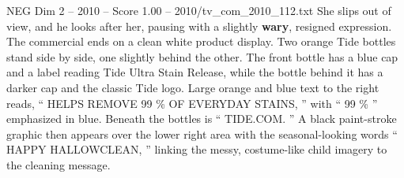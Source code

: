 \begin{textsample}{NEG Dim 2 – 2010 – Score 1.00 – 2010/tv\_com\_2010\_112.txt}
She slips out of view, and he looks after her, pausing with a slightly \textbf{wary}, resigned expression.
The commercial ends on a clean white product display.
Two orange Tide bottles stand side by side, one slightly behind the other.
The front bottle has a blue cap and a label reading Tide Ultra Stain Release, while the bottle behind it has a darker cap and the classic Tide logo.
Large orange and blue text to the right reads, “ HELPS REMOVE 99 \% OF EVERYDAY STAINS, ” with “ 99 \% ” emphasized in blue.
Beneath the bottles is “ TIDE.COM. ” A black paint-stroke graphic then appears over the lower right area with the seasonal-looking words “ HAPPY HALLOWCLEAN, ” linking the messy, costume-like child imagery to the cleaning message.

\end{textsample}
